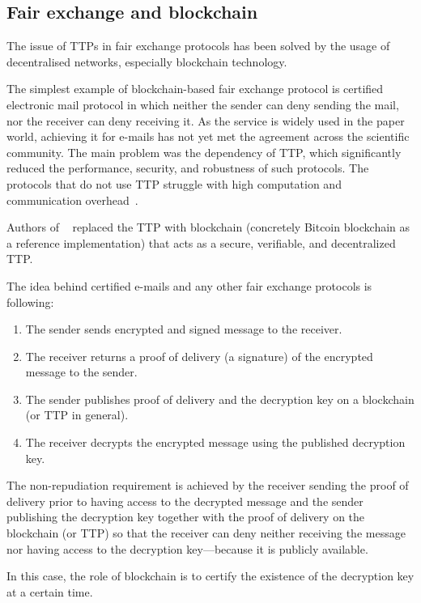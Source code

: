 \documentclass{ieeeaccess}
\begin{document}
\subsection{Fair exchange and blockchain}

The issue of TTPs in fair exchange protocols has been solved by the usage of decentralised networks, especially blockchain technology.

The simplest example of blockchain-based fair exchange protocol is certified electronic mail protocol in which neither the sender can deny sending the mail, nor the receiver can deny receiving it. As the service is widely used in the paper world, achieving it for e-mails has not yet met the agreement across the scientific community. The main problem was the dependency of TTP, which significantly reduced the performance, security, and robustness of such protocols. The protocols that do not use TTP struggle with high computation and communication overhead~\cite{hinarejosSolutionSecureCertified2019}.

Authors of ~\cite{hinarejosSolutionSecureCertified2019} replaced the TTP with blockchain (concretely Bitcoin blockchain as a reference implementation) that acts as a secure, verifiable, and decentralized TTP.

The idea behind certified e-mails and any other fair exchange protocols is following:
\begin{enumerate}
    \item The sender sends encrypted and signed message to the receiver.
    \item The receiver returns a proof of delivery (a signature) of the encrypted message to the sender.
    \item The sender publishes proof of delivery and the decryption key on a blockchain (or TTP in general).
    \item The receiver decrypts the encrypted message using the published decryption key.
\end{enumerate}

The non-repudiation requirement is achieved by the receiver sending the proof of delivery prior to having access to the decrypted message and the sender publishing the decryption key together with the proof of delivery on the blockchain (or TTP) so that the receiver can deny neither receiving the message nor having access to the decryption key—because it is publicly available.

In this case, the role of blockchain is to certify the existence of the decryption key at a certain time.
\end{document}
